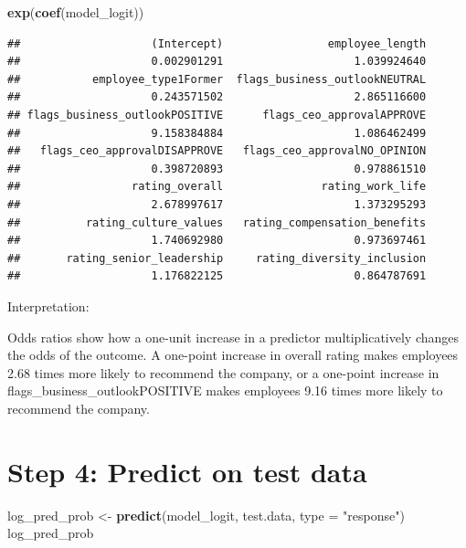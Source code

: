 \documentclass[
]{article}
\newenvironment{Shaded}{\begin{snugshade}}{\end{snugshade}}
\newcommand{\AttributeTok}[1]{\textcolor[rgb]{0.13,0.29,0.53}{#1}}
\newcommand{\FunctionTok}[1]{\textcolor[rgb]{0.13,0.29,0.53}{\textbf{#1}}}
\newcommand{\NormalTok}[1]{#1}
\newcommand{\OtherTok}[1]{\textcolor[rgb]{0.56,0.35,0.01}{#1}}
\newcommand{\StringTok}[1]{\textcolor[rgb]{0.31,0.60,0.02}{#1}}
\begin{document}
\begin{Shaded}
\begin{Highlighting}[]
\FunctionTok{exp}\NormalTok{(}\FunctionTok{coef}\NormalTok{(model\_logit))}
\end{Highlighting}
\end{Shaded}

\begin{verbatim}
##                    (Intercept)                employee_length 
##                    0.002901291                    1.039924640 
##           employee_type1Former  flags_business_outlookNEUTRAL 
##                    0.243571502                    2.865116600 
## flags_business_outlookPOSITIVE      flags_ceo_approvalAPPROVE 
##                    9.158384884                    1.086462499 
##   flags_ceo_approvalDISAPPROVE   flags_ceo_approvalNO_OPINION 
##                    0.398720893                    0.978861510 
##                 rating_overall               rating_work_life 
##                    2.678997617                    1.373295293 
##          rating_culture_values   rating_compensation_benefits 
##                    1.740692980                    0.973697461 
##       rating_senior_leadership     rating_diversity_inclusion 
##                    1.176822125                    0.864787691
\end{verbatim}

Interpretation:

Odds ratios show how a one-unit increase in a predictor multiplicatively
changes the odds of the outcome. A one-point increase in overall rating
makes employees 2.68 times more likely to recommend the company, or a
one-point increase in flags\_business\_outlookPOSITIVE makes employees
9.16 times more likely to recommend the company.

\section{Step 4: Predict on test
data}\label{step-4-predict-on-test-data}

\begin{Shaded}
\begin{Highlighting}[]
\NormalTok{log\_pred\_prob }\OtherTok{\textless{}{-}} \FunctionTok{predict}\NormalTok{(model\_logit, test.data, }\AttributeTok{type =} \StringTok{"response"}\NormalTok{)}
\NormalTok{log\_pred\_prob}
\end{Highlighting}
\end{Shaded}
\end{document}

